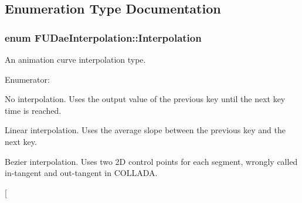 \subsection{Enumeration Type Documentation}
\hypertarget{namespaceFUDaeInterpolation_a209a941c2fb6ece1325352968aa0374f}{
\subsubsection[{Interpolation}]{\setlength{\rightskip}{0pt plus 5cm}enum {\bf FUDaeInterpolation::Interpolation}}}
\label{namespaceFUDaeInterpolation_a209a941c2fb6ece1325352968aa0374f}
An animation curve interpolation type. \begin{Desc}
\item[Enumerator: ]\par
\begin{description}
\item[{\em 
\hypertarget{namespaceFUDaeInterpolation_a209a941c2fb6ece1325352968aa0374fa5e75d1c742698445eeb81394232221e3}{
STEP}
\label{namespaceFUDaeInterpolation_a209a941c2fb6ece1325352968aa0374fa5e75d1c742698445eeb81394232221e3}
}]No interpolation. Uses the output value of the previous key until the next key time is reached. \item[{\em 
\hypertarget{namespaceFUDaeInterpolation_a209a941c2fb6ece1325352968aa0374fa1408bf464b40a99bef3cc2cc0ee68984}{
LINEAR}
\label{namespaceFUDaeInterpolation_a209a941c2fb6ece1325352968aa0374fa1408bf464b40a99bef3cc2cc0ee68984}
}]Linear interpolation. Uses the average slope between the previous key and the next key. \item[{\em 
\hypertarget{namespaceFUDaeInterpolation_a209a941c2fb6ece1325352968aa0374fa4c3b611ce39dc32e31034f5a371f6fc6}{
BEZIER}
\label{namespaceFUDaeInterpolation_a209a941c2fb6ece1325352968aa0374fa4c3b611ce39dc32e31034f5a371f6fc6}
}]Bezier interpolation. Uses two 2D control points for each segment, wrongly called in-\/tangent and out-\/tangent in COLLADA. \item[{\em 
}
\end{description}
\end{Desc}
